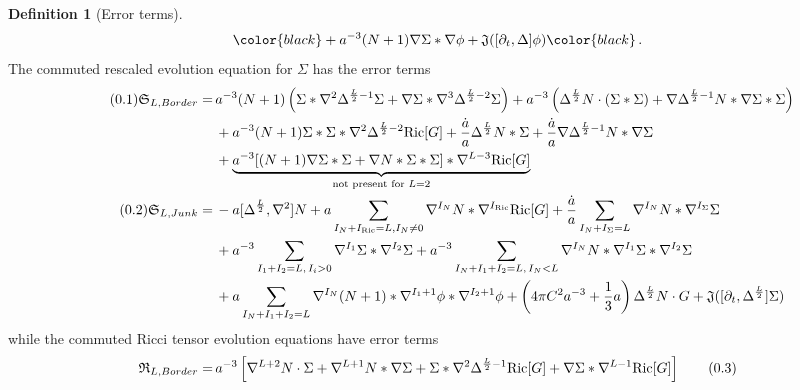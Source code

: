 \documentclass[11pt,leqno,textwidth=10cm]{amsart}
\numberwithin{equation}{section}
\theoremstyle{definition}
\newtheorem{definition}{Definition}[section]
\theoremstyle{plain}
\newcommand{\1}{\mathbbm{1}}
\newcommand{\Ric}{\text{\normalfont{Ric}}}
\newcommand{\del}{\partial}
\newcommand{\Lap}{\Delta}
\newcommand{\numberthis}{\addtocounter{equation}{1}\tag{\theequation}}
\renewcommand{\theequation}{\arabic{section}.\arabic{equation}}
\newcommand{\change}[1]{\color{black}#1\color{black}}
\begin{document}
\begin{definition}[Error terms]
\begin{subequations}
{\begin{align*}
\change{+a^{-3}(N+1)\nabla\Sigma\ast\nabla\phi+\mathfrak{J}([\del_t,\Lap]\phi)}\,.
\end{align*}}
\end{subequations}
The commuted rescaled evolution equation for $\Sigma$ has the error terms
{\scriptsize \begin{subequations}
\begin{align*}
\numberthis\label{eq:comeq-Sigma-border}\mathfrak{S}_{L,Border}=&\,a^{-3}(N+1)\left(\Sigma\ast\nabla^2\Lap^{\frac{L}2-1}\Sigma+\nabla\Sigma\ast\nabla^3\Lap^{\frac{L}2-2}\Sigma\right)+a^{-3}\left(\Lap^{\frac{L}2}N\cdot(\Sigma\ast\Sigma)+\nabla\Lap^{\frac{L}2-1}N\ast\nabla\Sigma\ast\Sigma\right)\\
&\,+a^{-3}(N+1)\Sigma\ast\Sigma\ast\nabla^2\Lap^{\frac{L}2-2}\Ric[G]+\frac{\dot{a}}a\Lap^{\frac{L}2}N\ast\Sigma+\frac{\dot{a}}a\nabla\Lap^{\frac{L}2-1}N\ast\nabla\Sigma\\
&\,+\underbrace{a^{-3}[(N+1)\nabla\Sigma\ast\Sigma+\nabla N\ast\Sigma\ast\Sigma]\ast\nabla^{L-3}\Ric[G]}_{\text{not present for }L=2}\\
\numberthis\label{eq:comeq-Sigma-junk}\mathfrak{S}_{L,Junk}=&\,-a[\Lap^\frac{L}2,\nabla^2]N+a\sum_{I_N+I_\Ric=L,I_N\neq 0}\nabla^{I_N} N\ast\nabla^{I_\Ric}\Ric[G]+\frac{\dot{a}}a\sum_{I_N+I_\Sigma=L}\nabla^{I_N}N\ast\nabla^{I_\Sigma}\Sigma\\
&\,+a^{-3}\sum_{I_1+I_2=L,\,I_i>0}\nabla^{I_1}\Sigma\ast\nabla^{I_2}\Sigma+a^{-3}\sum_{I_N+I_{1}+I_{2}=L,\,I_N<L}\nabla^{I_N}N\ast\nabla^{I_1}\Sigma\ast\nabla^{I_2}\Sigma\\
&\,+a\sum_{I_N+I_1+I_2=L}\nabla^{I_N}(N+1)\ast\nabla^{I_1+1}\phi\ast\nabla^{I_2+1}\phi+\left(4\pi C^2a^{-3}+\frac13a\right)\Lap^\frac{L}2N\cdot G+\mathfrak{J}([\del_t,\Lap^{\frac{L}2}]\Sigma)
\end{align*}
\end{subequations}}
while the commuted Ricci tensor evolution equations have error terms
{\scriptsize
\begin{subequations}
\begin{align*}
\mathfrak{R}_{L,Border}=&\,a^{-3}\left[\nabla^{L+2}N\cdot\Sigma+\nabla^{L+1}N\ast\nabla\Sigma+\Sigma\ast\nabla^2\Lap^{\frac{L}2-1}\Ric[G]+\nabla\Sigma\ast\nabla^{L-1}\Ric[G]\right] \numberthis\label{eq:comeq-Ric-even-border}\\

\end{align*}
\end{subequations}}
\end{definition}
\end{document}
